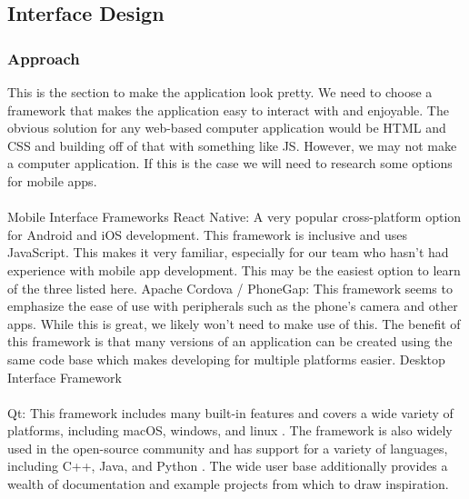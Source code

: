 \documentclass[onecolumn, draftclsnofoot,10pt, compsoc]{IEEEtran}
\begin{document}
\subsection{Interface Design}
\subsubsection{Approach}
This is the section to make the application look pretty. We need to choose a framework that makes the application easy to interact with and enjoyable.
\newline
The obvious solution for any web-based computer application would be HTML and CSS and building off of that with something like JS. However, we may not make a computer application. If this is the case we will need to research some options for mobile apps.
\\\\
\noindent
Mobile Interface Frameworks
\newline
\newline
\noindent
React Native: 
A very popular cross-platform option for Android and iOS development. This framework is inclusive and uses JavaScript. This makes it very familiar, especially for our team who hasn't had experience with mobile app development. This may be the easiest option to learn of the three listed here.
\newline
\newline
Apache Cordova / PhoneGap: 
This framework seems to emphasize the ease of use with peripherals such as the phone's camera and other apps. While this is great, we likely won't need to make use of this. The benefit of this framework is that many versions of an application can be created using the same code base which makes developing for multiple platforms easier.
\newline
\newline
\noindent
Desktop Interface Framework
\\\\
Qt: This framework includes many built-in features and covers a wide variety of platforms, including macOS, windows, and linux \autocite{qplatforms}. 
The framework is also widely used in the open-source community and has support for a variety of languages, including C++, Java, and Python \autocite{qplatforms}.
The wide user base additionally provides a wealth of documentation and example projects from which to draw inspiration.
\end{document}
